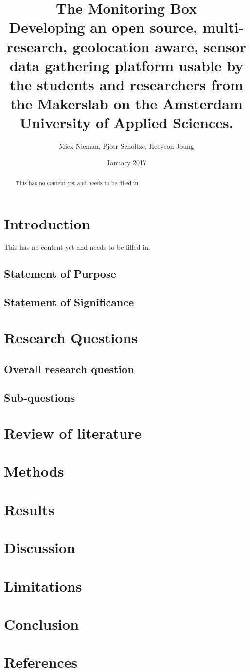 \documentclass{report}
\title{The Monitoring Box \\ Developing an open source, multi-research, geolocation aware, sensor data gathering platform usable by the students and researchers from the Makerslab on the Amsterdam University of Applied Sciences.}
\author{Mick Nieman, Pjotr Scholtze, Heeyeon Joung}
\date{January 2017}
\begin{document}
\maketitle

\begin{abstract}
    This has no content yet and needs to be filled in. 
\end{abstract}

\tableofcontents

\chapter{Introduction}
This has no content yet and needs to be filled in. 

\section{Statement of Purpose}
\section{Statement of Significance}

\chapter{Research Questions}
\section{Overall research question}
\section{Sub-questions}

\chapter{Review of literature}

\chapter{Methods}

\chapter{Results}

\chapter{Discussion}

\chapter{Limitations}

\chapter{Conclusion}

\chapter{References}
\end{document}

